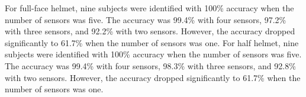 \documentclass[sigchi,authordraft]{acmart}
\newcommand\figref[1]{\textbf{Figure~\ref{fig:#1}}}
\newcommand\tabref[1]{\textbf{Table~\ref{tab:#1}}}
\begin{document}
For full-face helmet, nine subjects were identified with 100\% accuracy when the number of sensors was five. The accuracy was 99.4\% with four sensors, 97.2\% with three sensors, and 92.2\% with two sensors. However, the accuracy dropped significantly to 61.7\% when the number of sensors was one. 
For half helmet, nine subjects were identified with 100\% accuracy when the number of sensors was five. The accuracy was 99.4\% with four sensors, 98.3\% with three sensors, and 92.8\% with two sensors. However, the accuracy dropped significantly to 61.7\% when the number of sensors was one.\par







\end{document}
